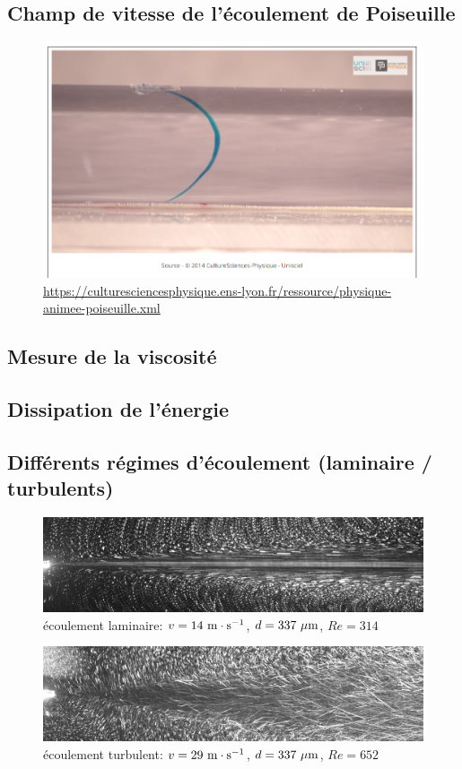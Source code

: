 \documentclass[10pt]{beamer}
\begin{document}
\subsection{Champ de vitesse de l'écoulement de Poiseuille}

\begin{frame}{\insertsubsection}
    \begin{figure}
        \centering
        \includegraphics[width=.7\textwidth]{Poiseuille_ens_lyon.png}
        \caption{\url{https://culturesciencesphysique.ens-lyon.fr/ressource/physique-animee-poiseuille.xml}}
    \end{figure}
\end{frame}

\subsection{Mesure de la viscosité}
\subsection{Dissipation de l'énergie}
\subsection{Différents régimes d'écoulement (laminaire / turbulents)}
\begin{frame}{\insertsubsection}
    \begin{figure}
        \centering
        \includegraphics[width=.7\textwidth]{laminaire_Q75p63_texposure2ms_fps100.png}
        \caption{écoulement laminaire: $v = 14~\rm m\cdot s^{-1}$, $d =337~\rm \mu m $, $Re = 314$}
    \end{figure}
    \begin{figure}
        \centering
        \includegraphics[width=.7\textwidth]{turbulent_Q157p87_texposure2ms_fps100_fumee_2_40images.png}
        \caption{écoulement turbulent: $v = 29~\rm m\cdot s^{-1}$, $d =337~\rm \mu m$, $Re = 652$}
    \end{figure}
\end{frame}
\end{document}
